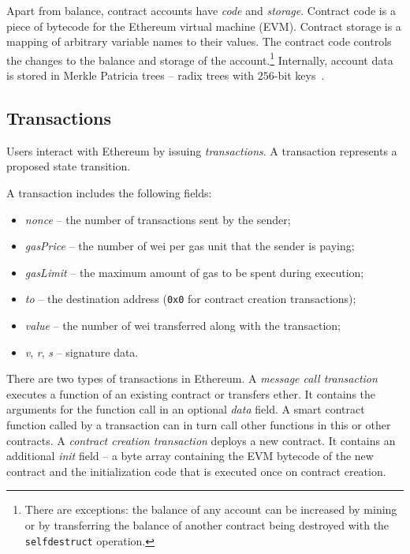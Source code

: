 Apart from balance, contract accounts have \textit{code} and \textit{storage}.
Contract code is a piece of bytecode for the Ethereum virtual machine (EVM).
Contract storage is a mapping of arbitrary variable names to their values.
The contract code controls the changes to the balance and storage of the account.\footnote{There are exceptions: the balance of any account can be increased by mining or by transferring the balance of another contract being destroyed with the \texttt{selfdestruct} operation.}
Internally, account data is stored in Merkle Patricia trees -- radix trees with $256$-bit keys~\cite{MPTSpec, Buchman14}.


\subsection{Transactions}

Users interact with Ethereum by issuing \textit{transactions}.
A transaction represents a proposed state transition.

A transaction includes the following fields:
\begin{itemize}
	\item \emph{nonce} -- the number of transactions sent by the sender;
	\item \emph{gasPrice} -- the number of wei per gas unit that the sender is paying;
	\item \emph{gasLimit} -- the maximum amount of gas to be spent during execution;
	\item \emph{to} -- the destination address (\texttt{0x0} for contract creation transactions);
	\item \emph{value} -- the number of wei transferred along with the transaction;
	\item \emph{v}, \emph{r}, \emph{s} -- signature data.
\end{itemize}

There are two types of transactions in Ethereum.
A \textit{message call transaction} executes a function of an existing contract or transfers ether.
It contains the arguments for the function call in an optional \textit{data} field.
A smart contract function called by a transaction can in turn call other functions in this or other contracts.
A \textit{contract creation transaction} deploys a new contract.
It contains an additional \emph{init} field -- a byte array containing the EVM bytecode of the new contract and the initialization code that is executed once on contract creation.

